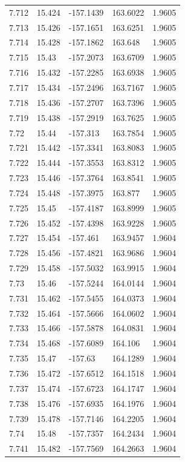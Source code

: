 \begin{tabular}{lllll}
7.712 & 15.424 & -157.1439 & 163.6022 & 1.9605 \\
7.713 & 15.426 & -157.1651 & 163.6251 & 1.9605 \\
7.714 & 15.428 & -157.1862 & 163.648 & 1.9605 \\
7.715 & 15.43 & -157.2073 & 163.6709 & 1.9605 \\
7.716 & 15.432 & -157.2285 & 163.6938 & 1.9605 \\
7.717 & 15.434 & -157.2496 & 163.7167 & 1.9605 \\
7.718 & 15.436 & -157.2707 & 163.7396 & 1.9605 \\
7.719 & 15.438 & -157.2919 & 163.7625 & 1.9605 \\
7.72 & 15.44 & -157.313 & 163.7854 & 1.9605 \\
7.721 & 15.442 & -157.3341 & 163.8083 & 1.9605 \\
7.722 & 15.444 & -157.3553 & 163.8312 & 1.9605 \\
7.723 & 15.446 & -157.3764 & 163.8541 & 1.9605 \\
7.724 & 15.448 & -157.3975 & 163.877 & 1.9605 \\
7.725 & 15.45 & -157.4187 & 163.8999 & 1.9605 \\
7.726 & 15.452 & -157.4398 & 163.9228 & 1.9605 \\
7.727 & 15.454 & -157.461 & 163.9457 & 1.9604 \\
7.728 & 15.456 & -157.4821 & 163.9686 & 1.9604 \\
7.729 & 15.458 & -157.5032 & 163.9915 & 1.9604 \\
7.73 & 15.46 & -157.5244 & 164.0144 & 1.9604 \\
7.731 & 15.462 & -157.5455 & 164.0373 & 1.9604 \\
7.732 & 15.464 & -157.5666 & 164.0602 & 1.9604 \\
7.733 & 15.466 & -157.5878 & 164.0831 & 1.9604 \\
7.734 & 15.468 & -157.6089 & 164.106 & 1.9604 \\
7.735 & 15.47 & -157.63 & 164.1289 & 1.9604 \\
7.736 & 15.472 & -157.6512 & 164.1518 & 1.9604 \\
7.737 & 15.474 & -157.6723 & 164.1747 & 1.9604 \\
7.738 & 15.476 & -157.6935 & 164.1976 & 1.9604 \\
7.739 & 15.478 & -157.7146 & 164.2205 & 1.9604 \\
7.74 & 15.48 & -157.7357 & 164.2434 & 1.9604 \\
7.741 & 15.482 & -157.7569 & 164.2663 & 1.9604 \\

\end{tabular}

